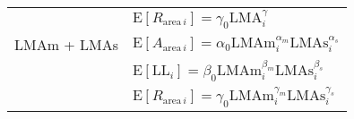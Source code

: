 \documentclass[
  12pt,
]{article}
\providecommand{\DIFaddbegin}{} %
\providecommand{\DIFaddend}{} %
\providecommand{\DIFdelbegin}{} %
\providecommand{\DIFdelend}{} %
\newcommand{\DIFscaledelfig}{0.5}
\newlength{\DIFdelgraphicswidth} %
\newlength{\DIFdelgraphicsheight} %
\newcommand{\DIFaddincludegraphics}[2][]{{\color{blue}\fbox{\DIFOincludegraphics[#1]{#2}}}} %
\newcommand{\DIFdelincludegraphics}[2][]{%
\sbox{\DIFdelgraphicsbox}{\DIFOincludegraphics[#1]{#2}}%
\settoboxwidth{\DIFdelgraphicswidth}{\DIFdelgraphicsbox} %
\settoboxtotalheight{\DIFdelgraphicsheight}{\DIFdelgraphicsbox} %
\scalebox{\DIFscaledelfig}{%
\parbox[b]{\DIFdelgraphicswidth}{\usebox{\DIFdelgraphicsbox}\\[-\baselineskip] \rule{\DIFdelgraphicswidth}{0em}}\llap{\resizebox{\DIFdelgraphicswidth}{\DIFdelgraphicsheight}{%
\setlength{\unitlength}{\DIFdelgraphicswidth}%
\begin{picture}(1,1)%
\thicklines\linethickness{2pt} %
{\color[rgb]{1,0,0}\put(0,0){\framebox(1,1){}}}%
{\color[rgb]{1,0,0}\put(0,0){\line( 1,1){1}}}%
{\color[rgb]{1,0,0}\put(0,1){\line(1,-1){1}}}%
\end{picture}%
}\hspace*{3pt}}} %
} %
\DeclareRobustCommand{\DIFaddbegin}{\DIFOaddbegin \let\includegraphics\DIFaddincludegraphics} %
\DeclareRobustCommand{\DIFaddend}{\DIFOaddend \let\includegraphics\DIFOincludegraphics} %
\DeclareRobustCommand{\DIFdelbegin}{\DIFOdelbegin \let\includegraphics\DIFdelincludegraphics} %
\DeclareRobustCommand{\DIFdelend}{\DIFOaddend \let\includegraphics\DIFOincludegraphics} %
\begin{document}
\begin{longtable}[]{@{}
  >{\raggedright\arraybackslash}p{}
  >{\raggedright\arraybackslash}p{}@{}}
\DIFdelend \DIFaddbegin \\
\DIFaddend & \DIFdelbegin %
\DIFdelend \(\mathrm{E}[R_{\mathrm{area} \, i}] = \gamma_0\mathrm{LMA}_{i}^{\gamma}\) \DIFdelbegin %
\DIFdelend \DIFaddbegin \\
\DIFaddend LMAm + LMAs \DIFdelbegin %
\DIFdelend & \DIFdelbegin %
\DIFdelend \(\mathrm{E}[A_{\mathrm{area} \, i}] = \alpha_0\mathrm{LMAm}_{i}^{\alpha_m} \mathrm{LMAs}_{i}^{\alpha_s}\) \DIFdelbegin %
\DIFdelend \DIFaddbegin \\
\DIFaddend & \DIFdelbegin %
\DIFdelend \(\mathrm{E}[\mathrm{LL}_i] = \beta_0\mathrm{LMAm}_{i}^{\beta_m} \mathrm{LMAs}_{i}^{\beta_s}\) \DIFdelbegin %
\DIFdelend \DIFaddbegin \\
\DIFaddend & \DIFdelbegin %
\DIFdelend \(\mathrm{E}[R_{\mathrm{area} \, i}] = \gamma_0\mathrm{LMAm}_{i}^{\gamma_m} \mathrm{LMAs}_{i}^{\gamma_s}\) \DIFdelbegin %

\end{longtable}
\end{document}
